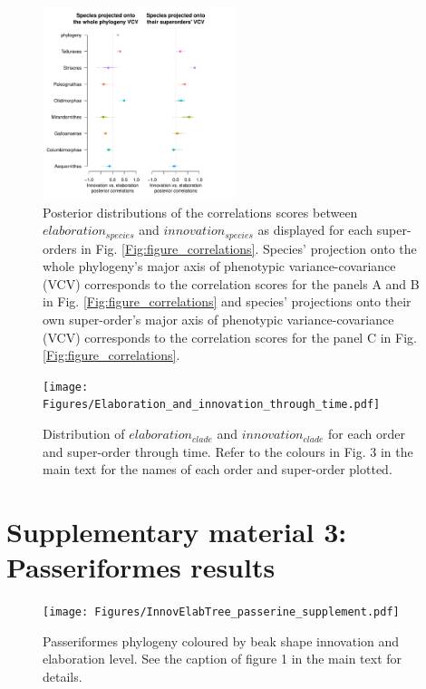\documentclass[12pt,letterpaper]{article}
\begin{document}
\begin{figure}[htpb]
\centering
\centering
   \includegraphics[width=0.5\textwidth]{Figures/correlations_fable.pdf}
\caption{Posterior distributions of the correlations scores between $elaboration_{species}$ and $innovation_{species}$ as displayed for each super-orders in Fig. \ref{Fig:figure_correlations}. Species' projection onto the whole phylogeny's major axis of phenotypic variance-covariance (VCV) corresponds to the correlation scores for the panels A and B in Fig. \ref{Fig:figure_correlations} and species' projections onto their own super-order's major axis of phenotypic variance-covariance (VCV) corresponds to the correlation scores for the panel C in Fig. \ref{Fig:figure_correlations}.}
\label{Fig:fable_correlations}
\end{figure}


\begin{figure}[htpb]
\centering
\centering
   \texttt{[image: Figures/Elaboration\_and\_innovation\_through\_time.pdf]}
\caption{Distribution of $elaboration_{clade}$ and $innovation_{clade}$ for each order and super-order through time. Refer to the colours in Fig. 3 in the main text for the names of each order and super-order plotted.}
\end{figure}



\clearpage
\section{Supplementary material 3: Passeriformes results}

\begin{figure}[!htbp]
\centering
    \texttt{[image: Figures/InnovElabTree\_passerine\_supplement.pdf]}
\caption{Passeriformes phylogeny coloured by beak shape innovation and elaboration level. See the caption of figure 1 in the main text for details.}
\label{fig_phylogeny_passeriformes}
\end{figure}
\end{document}
